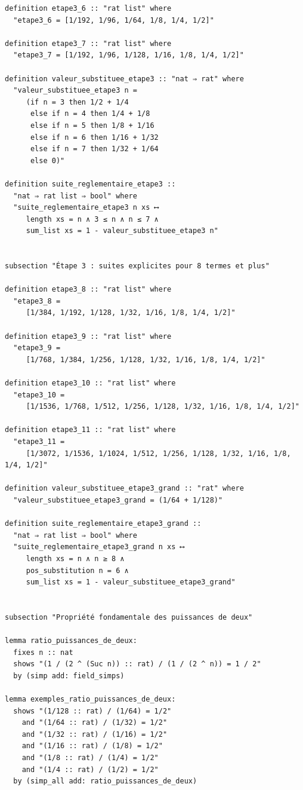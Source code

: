 \documentclass[a4paper,11pt]{article}
\begin{document}
\begin{holcode}[title={\textcolor{white}{File: methode\_de\_philippot.thy -- COMPLETE}}]
\begin{lstlisting}
definition etape3_6 :: "rat list" where
  "etape3_6 = [1/192, 1/96, 1/64, 1/8, 1/4, 1/2]"

definition etape3_7 :: "rat list" where
  "etape3_7 = [1/192, 1/96, 1/128, 1/16, 1/8, 1/4, 1/2]"

definition valeur_substituee_etape3 :: "nat ⇒ rat" where
  "valeur_substituee_etape3 n =
     (if n = 3 then 1/2 + 1/4
      else if n = 4 then 1/4 + 1/8
      else if n = 5 then 1/8 + 1/16
      else if n = 6 then 1/16 + 1/32
      else if n = 7 then 1/32 + 1/64
      else 0)"

definition suite_reglementaire_etape3 ::
  "nat ⇒ rat list ⇒ bool" where
  "suite_reglementaire_etape3 n xs ⟷
     length xs = n ∧ 3 ≤ n ∧ n ≤ 7 ∧
     sum_list xs = 1 - valeur_substituee_etape3 n"


subsection "Étape 3 : suites explicites pour 8 termes et plus"

definition etape3_8 :: "rat list" where
  "etape3_8 =
     [1/384, 1/192, 1/128, 1/32, 1/16, 1/8, 1/4, 1/2]"

definition etape3_9 :: "rat list" where
  "etape3_9 =
     [1/768, 1/384, 1/256, 1/128, 1/32, 1/16, 1/8, 1/4, 1/2]"

definition etape3_10 :: "rat list" where
  "etape3_10 =
     [1/1536, 1/768, 1/512, 1/256, 1/128, 1/32, 1/16, 1/8, 1/4, 1/2]"

definition etape3_11 :: "rat list" where
  "etape3_11 =
     [1/3072, 1/1536, 1/1024, 1/512, 1/256, 1/128, 1/32, 1/16, 1/8, 1/4, 1/2]"

definition valeur_substituee_etape3_grand :: "rat" where
  "valeur_substituee_etape3_grand = (1/64 + 1/128)"

definition suite_reglementaire_etape3_grand ::
  "nat ⇒ rat list ⇒ bool" where
  "suite_reglementaire_etape3_grand n xs ⟷
     length xs = n ∧ n ≥ 8 ∧
     pos_substitution n = 6 ∧
     sum_list xs = 1 - valeur_substituee_etape3_grand"


subsection "Propriété fondamentale des puissances de deux"

lemma ratio_puissances_de_deux:
  fixes n :: nat
  shows "(1 / (2 ^ (Suc n)) :: rat) / (1 / (2 ^ n)) = 1 / 2"
  by (simp add: field_simps)

lemma exemples_ratio_puissances_de_deux:
  shows "(1/128 :: rat) / (1/64) = 1/2"
    and "(1/64 :: rat) / (1/32) = 1/2"
    and "(1/32 :: rat) / (1/16) = 1/2"
    and "(1/16 :: rat) / (1/8) = 1/2"
    and "(1/8 :: rat) / (1/4) = 1/2"
    and "(1/4 :: rat) / (1/2) = 1/2"
  by (simp_all add: ratio_puissances_de_deux)


\end{lstlisting}
\end{holcode}
\end{document}
